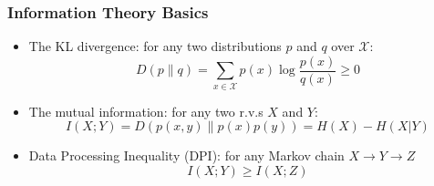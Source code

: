 \documentclass{beamer}
\begin{document}



\begin{frame}
    \frametitle{Information Theory Basics}
    
    \begin{itemize}
        \item The KL divergence: for any two distributions $p$ and $q$ over $\mathcal{X}$:
        \begin{equation*}
            D\left(p \| q\right) = \sum_{x\in\mathcal{X}} p(x) \log \frac{p(x)}{q(x)} \ge 0
        \end{equation*}
        \item The mutual information: for any two r.v.s $X$ and $Y$:
        \begin{equation*}
            I(X;Y)=D\left(p(x,y) \| p(x)p(y)\right) = H(X) - H(X|Y)
        \end{equation*}
        \item Data Processing Inequality (DPI): for any Markov chain $X\to Y\to Z$
        \begin{equation*}
            I(X;Y)\geq I(X;Z)
        \end{equation*}
    \end{itemize}
    
\end{frame}

\end{document}
